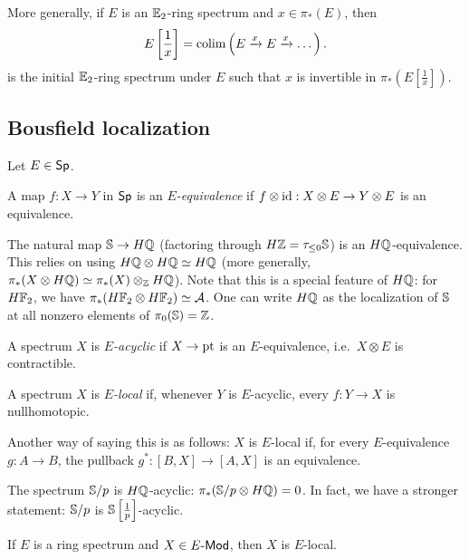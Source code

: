 \documentclass{article}
\begin{document}
More generally, if $E$ is an $\mathbb{E}_2$-ring spectrum and $x \in \pi_*(E)$, then 
\[
	E\left[\frac{1}{x}\right] = \operatorname*{colim} \left( E \xrightarrow{x} E \xrightarrow{x} \dots \right).
\]
is the initial $\mathbb{E}_2$-ring spectrum under $E$ such that $x$ is invertible in $\pi_*\left(E\left[\frac{1}{x}\right]\right)$.

\subsection{Bousfield localization}

Let $E \in \mathsf{Sp}$.

\begin{dfn}
	A map $f: X \to Y$ in $\mathsf{Sp}$ is an \emph{$E$-equivalence} if $f \otimes \operatorname{id}: X \otimes E \to Y \otimes E$ is an equivalence.
\end{dfn}

\begin{ex}
	The natural map $\mathbb{S} \to H\mathbb{Q}$ (factoring through $H\mathbb{Z} = \tau_{\leq 0} \mathbb{S}$) is an $H\mathbb{Q}$-equivalence.
	This relies on using $H\mathbb{Q} \otimes H\mathbb{Q} \simeq H\mathbb{Q}$ (more generally, $\pi_*(X \otimes H\mathbb{Q}) \simeq \pi_*(X) \otimes_{\mathbb{Z}} H\mathbb{Q}$).
	Note that this is a special feature of $H\mathbb{Q}$: for $H\mathbb{F}_2$, we have $\pi_*(H\mathbb{F}_2 \otimes H\mathbb{F}_2) \simeq \mathcal{A}$.
	One can write $H\mathbb{Q}$ as the localization of $\mathbb{S}$ at all nonzero elements of $\pi_0(\mathbb{S}) = \mathbb{Z}$.
\end{ex}

\begin{dfn}
	A spectrum $X$ is \emph{$E$-acyclic} if $X \to \mathrm{pt}$ is an $E$-equivalence, i.e.\ $X \otimes E$ is contractible.
\end{dfn}

\begin{dfn}
	A spectrum $X$ is \emph{$E$-local} if, whenever $Y$ is $E$-acyclic, every $f: Y \to X$ is nullhomotopic.
\end{dfn}

Another way of saying this is as follows: $X$ is $E$-local if, for every $E$-equivalence $g: A \to B$, the pullback $g^*: [B, X] \to [A, X]$ is an equivalence.

\begin{ex}
	The spectrum $\mathbb{S} / p$ is $H\mathbb{Q}$-acyclic: $\pi_*(\mathbb{S} / p \otimes H\mathbb{Q}) = 0$.
	In fact, we have a stronger statement: $\mathbb{S} / p$ is $\mathbb{S}\left[\frac{1}{p}\right]$-acyclic.
\end{ex}

\begin{prop}
	If $E$ is a ring spectrum and $X \in E\textrm{-}\mathsf{Mod}$, then $X$ is $E$-local.
\end{prop}
\end{document}
